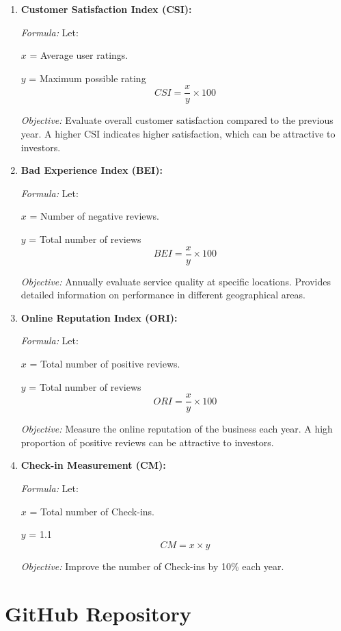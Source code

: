 \documentclass[12pt]{article}
\begin{document}
\begin{enumerate}
    \item \textbf{Customer Satisfaction Index (CSI):}
    
    \textit{Formula:} Let:
    
    $x$ = Average user ratings.
    
    $y$ = Maximum possible rating
    $$CSI = \frac{x}{y}\times 100$$
    
    \textit{Objective:} Evaluate overall customer satisfaction compared to the previous year. A higher CSI indicates higher satisfaction, which can be attractive to investors.

     \item \textbf{Bad Experience Index (BEI):}
     
    \textit{Formula:} Let:
    
    $x$ = Number of negative reviews.
    
    $y$ = Total number of reviews
    $$BEI = \frac{x}{y}\times 100$$
    
    \textit{Objective:} Annually evaluate service quality at specific locations. Provides detailed information on performance in different geographical areas.

    \item \textbf{Online Reputation Index (ORI):}
    
    \textit{Formula:} Let:
    
    $x$ = Total number of positive reviews.
    
    $y$ = Total number of reviews
    $$ORI = \frac{x}{y}\times 100$$
        
    \textit{Objective:} Measure the online reputation of the business each year. A high proportion of positive reviews can be attractive to investors.

    \item \textbf{Check-in Measurement (CM):}
    
    \textit{Formula:} Let:
    
    $x$ = Total number of Check-ins.
    
    $y$ = 1.1  
    $$CM = x\times y$$
    
    \textit{Objective:} Improve the number of Check-ins by 10\% each year.
\end{enumerate}

\section{GitHub Repository}
\end{document}
